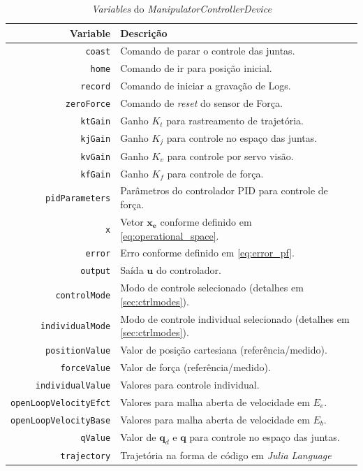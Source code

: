 \begin{table}[h!]
\centering
\caption{\textit{Variables} do \textit{ManipulatorControllerDevice}}
\label{tab:variables}
\begin{tabular}{rl} \hline
Variable & Descrição \\ \hline
\verb|coast| & 				Comando de parar o controle das juntas. \\
\verb|home| &  				Comando de ir para posição inicial. \\
\verb|record|& 				Comando de iniciar a gravação de Logs.\\
\verb|zeroForce|& 			Comando de \textit{reset} do sensor de Força.\\
\verb|ktGain|&				Ganho $K_t$ para rastreamento de trajetória. \\
\verb|kjGain|&				Ganho $K_j$ para controle no espaço das juntas.\\
\verb|kvGain|&				Ganho $K_v$ para controle por servo visão.\\
\verb|kfGain|&				Ganho $K_f$ para controle de força.\\
\verb|pidParameters|&		Parâmetros do controlador PID para controle de força.\\
\verb|x|&					Vetor $\bm{x_e}$ conforme definido em \ref{eq:operational_space}.\\				
\verb|error|&				Erro conforme definido em \ref{eq:error_pf}.\\
\verb|output|&				Saída $\bm{u}$ do controlador.\\
\verb|controlMode|&			Modo de controle selecionado (detalhes em \ref{sec:ctrlmodes}). \\
\verb|individualMode|&		Modo de controle individual selecionado (detalhes em \ref{sec:ctrlmodes}).\\
\verb|positionValue|&		Valor de posição cartesiana (referência/medido). \\
\verb|forceValue|&			Valor de força (referência/medido).\\
\verb|individualValue|&		Valores para controle individual.  \\
\verb|openLoopVelocityEfct|&Valores para malha aberta de velocidade em $E_e$. \\
\verb|openLoopVelocityBase|&Valores para malha aberta de velocidade em $E_b$. \\
\verb|qValue|&				Valor de $\bm{q}_d$ e $\bm{q}$ para controle no espaço das juntas.	\\
\verb|trajectory|&			Trajetória na forma de código em \textit{Julia Language}\\
\hline
\end{tabular}
\end{table}

